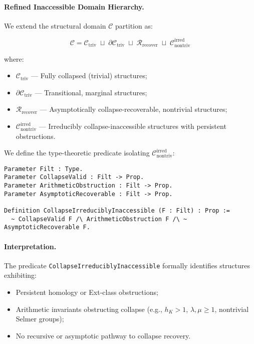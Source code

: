 \documentclass[11pt]{article}
\begin{document}
\paragraph{Refined Inaccessible Domain Hierarchy.}

We extend the structural domain $\mathcal{C}$ partition as:

\[
\mathcal{C} = \mathcal{C}_{\mathrm{triv}} \;\sqcup\; \partial \mathcal{C}_{\mathrm{triv}} \;\sqcup\; \mathcal{R}_{\mathrm{recover}} \;\sqcup\; \mathcal{C}_{\mathrm{nontriv}}^{\mathrm{irred}}
\]

where:

\begin{itemize}
    \item $\mathcal{C}_{\mathrm{triv}}$ — Fully collapsed (trivial) structures;
    \item $\partial \mathcal{C}_{\mathrm{triv}}$ — Transitional, marginal structures;
    \item $\mathcal{R}_{\mathrm{recover}}$ — Asymptotically collapse-recoverable, nontrivial structures;
    \item $\mathcal{C}_{\mathrm{nontriv}}^{\mathrm{irred}}$ — Irreducibly collapse-inaccessible structures with persistent obstructions.
\end{itemize}

We define the type-theoretic predicate isolating $\mathcal{C}_{\mathrm{nontriv}}^{\mathrm{irred}}$:

\begin{lstlisting}[language=Coq]
Parameter Filt : Type.
Parameter CollapseValid : Filt -> Prop.
Parameter ArithmeticObstruction : Filt -> Prop.
Parameter AsymptoticRecoverable : Filt -> Prop.

Definition CollapseIrreduciblyInaccessible (F : Filt) : Prop :=
  ~ CollapseValid F /\ ArithmeticObstruction F /\ ~ AsymptoticRecoverable F.
\end{lstlisting}

\paragraph{Interpretation.}

The predicate \texttt{CollapseIrreduciblyInaccessible} formally identifies structures exhibiting:

\begin{itemize}
    \item Persistent homology or Ext-class obstructions;
    \item Arithmetic invariants obstructing collapse (e.g., $h_K > 1$, $\lambda, \mu \geq 1$, nontrivial Selmer groups);
    \item No recursive or asymptotic pathway to collapse recovery.
\end{itemize}
\end{document}
